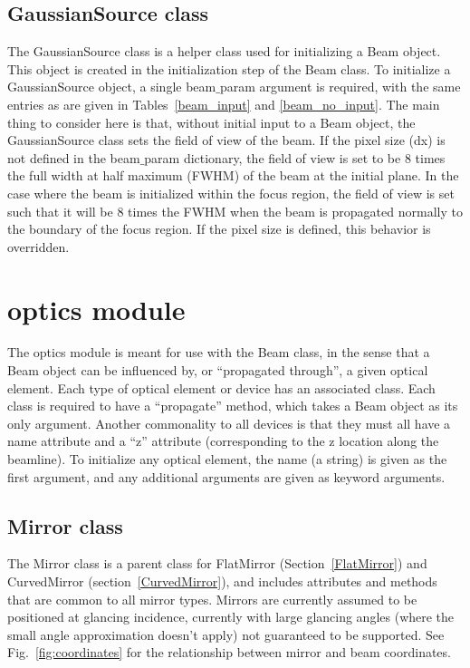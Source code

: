 \documentclass[11pt,fleqn]{article} %
\begin{document}
\subsection{GaussianSource class}
The GaussianSource class is a helper class used for initializing a Beam object. This object is created in the initialization step of the Beam class. To initialize a GaussianSource object, a single beam$\_$param argument is required, with the same entries as are given in Tables~\ref{beam_input} and \ref{beam_no_input}. The main thing to consider here is that, without initial input to a Beam object, the GaussianSource class sets the field of view of the beam. If the pixel size (dx) is not defined in the beam$\_$param dictionary, the field of view is set to be 8 times the full width at half maximum (FWHM) of the beam at the initial plane. In the case where the beam is initialized within the focus region, the field of view is set such that it will be 8 times the FWHM when the beam is propagated normally to the boundary of the focus region. If the pixel size is defined, this behavior is overridden.

\section{optics module}

The optics module is meant for use with the Beam class, in the sense that a Beam object can be influenced by, or ``propagated through'', a given optical element. Each type of optical element or device has an associated class. Each class is required to have a ``propagate'' method, which takes a Beam object as its only argument. Another commonality to all devices is that they must all have a name attribute and a ``z'' attribute (corresponding to the z location along the beamline). To initialize any optical element, the name (a string) is given as the first argument, and any additional arguments are given as keyword arguments.

\subsection{Mirror class}

The Mirror class is a parent class for FlatMirror (Section~\ref{FlatMirror}) and CurvedMirror (section~\ref{CurvedMirror}), and includes attributes and methods that are common to all mirror types. Mirrors are currently assumed to be positioned at glancing incidence, currently with large glancing angles (where the small angle approximation doesn't apply) not guaranteed to be supported. See Fig.~\ref{fig:coordinates} for the relationship between mirror and beam coordinates.
\end{document}

